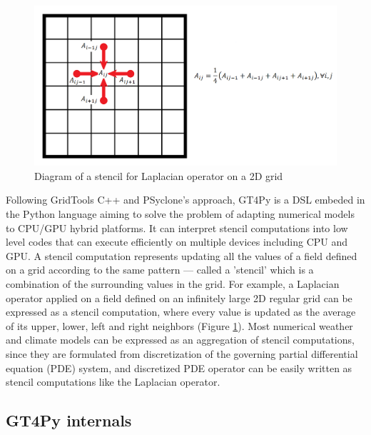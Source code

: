 \documentclass[]{article}
\begin{document}
\begin{figure}[h!]
	\centering
	\includegraphics[width=0.7\linewidth]{stencil.png}
	\caption{Diagram of a stencil for Laplacian operator on a 2D grid}\label{fig:stencil}
\end{figure}
Following GridTools C++ and PSyclone's approach, GT4Py is a DSL embeded in the Python language aiming to solve the problem of adapting numerical models to CPU/GPU hybrid platforms. It can interpret stencil computations into low level codes that can execute efficiently on multiple devices including CPU and GPU. A stencil computation represents updating all the values of a field defined on a grid according to the same pattern — called a 'stencil' which is a combination of the surrounding values in the grid. For example, a Laplacian operator applied on a field defined on an infinitely large 2D regular grid can be expressed as a stencil computation, where every value is updated as the average of its upper, lower, left and right neighbors (Figure \ref{fig:stencil}). Most numerical weather and climate models can be expressed as an aggregation of stencil computations, since they are formulated from discretization of the governing partial differential equation (PDE) system, and discretized PDE operator can be easily written as stencil computations like the Laplacian operator.

\subsection{GT4Py internals}
\end{document}

